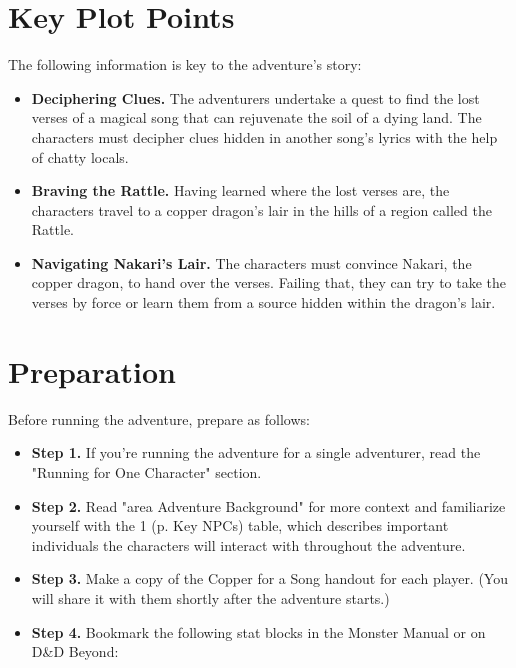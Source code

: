 \documentclass[letterpaper, 11pt, twocolumn]{dndbook}
\begin{document}
\section{Key Plot Points}

The following information is key to the adventure's story:

\begin{itemize}
\item \textbf{Deciphering Clues.} The adventurers undertake a quest to find the lost verses of a magical song that can rejuvenate the soil of a dying land. The characters must decipher clues hidden in another song's lyrics with the help of chatty locals.
\item \textbf{Braving the Rattle.} Having learned where the lost verses are, the characters travel to a copper dragon's lair in the hills of a region called the Rattle.
\item \textbf{Navigating Nakari's Lair.} The characters must convince Nakari, the copper dragon, to hand over the verses. Failing that, they can try to take the verses by force or learn them from a source hidden within the dragon's lair.
\end{itemize}
\section{Preparation}

Before running the adventure, prepare as follows:

\begin{itemize}
\item \textbf{Step 1.} If you're running the adventure for a single adventurer, read the "Running for One Character" section.
\item \textbf{Step 2.} Read "area Adventure Background" for more context and familiarize yourself with the 1 (p. Key NPCs) table, which describes important individuals the characters will interact with throughout the adventure.
\item \textbf{Step 3.} Make a copy of the Copper for a Song handout for each player. (You will share it with them shortly after the adventure starts.)
\item \textbf{Step 4.} Bookmark the following stat blocks in the Monster Manual or on D\&D Beyond:
\end{itemize}
\end{document}
